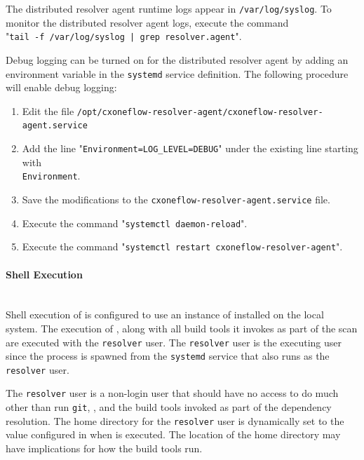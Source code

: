 The distributed resolver agent runtime logs appear in \texttt{/var/log/syslog}.  To monitor the distributed resolver agent logs, execute the command
\\"\texttt{tail -f /var/log/syslog | grep resolver.agent}".

Debug logging can be turned on for the distributed resolver agent by adding an environment variable in the \texttt{systemd}
service definition.  The following procedure will enable debug logging:

\begin{enumerate}
  \item Edit the file \texttt{/opt/cxoneflow-resolver-agent/cxoneflow-resolver-agent.service}
  \item Add the line "\texttt{Environment=LOG\_LEVEL=DEBUG}" under the existing line starting with\\\texttt{Environment}.
  \item Save the modifications to the \texttt{cxoneflow-resolver-agent.service} file.
  \item Execute the command "\texttt{systemctl daemon-reload}".
  \item Execute the command "\texttt{systemctl restart cxoneflow-resolver-agent}".
\end{enumerate}

\paragraph{Shell Execution}\label{par:agent-shell-execution}

\noindent\\Shell execution of \scaresolver is configured to use an instance of \scaresolver installed on the local system.
The execution of \scaresolverns, along with all build tools it invokes as part of the scan are executed with the \texttt{resolver}
user.  The \texttt{resolver} user is the executing user since the process is spawned from the \texttt{systemd} service that also
runs as the \texttt{resolver} user.

The \texttt{resolver} user is a non-login user that should have no access to do much other than run \texttt{git}, \scaresolverns, and
the build tools invoked as part of the dependency resolution.  The home directory for the \texttt{resolver} user is dynamically set
to the value configured in  when \scaresolver is executed.  The location
of the home directory may have implications for how the build tools run.

